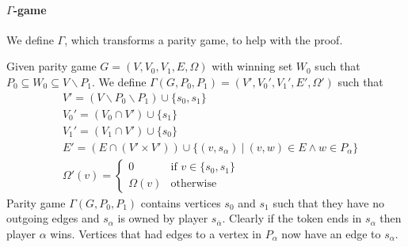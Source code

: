 \documentclass[]{article}
\begin{document}
	\paragraph{$\Gamma$-game} We define $\Gamma$, which transforms a parity game, to help with the proof.
	
	Given parity game $G=(V,V_0,V_1,E,\Omega)$ with winning set $W_0$ such that $P_0 \subseteq W_0 \subseteq V \backslash P_1$. We define $\Gamma(G,P_0,P_1) = (V',V_0',V_1',E',\Omega')$ such that
		\begin{align*}
		&V' = (V \backslash P_0 \backslash P_1) \cup \{s_0,s_1\}\\
		&V_0' = (V_0 \cap V') \cup \{s_1\}\\
		&V_1' = (V_1 \cap V') \cup \{s_0\}\\
		&E' = (E \cap (V' \times V')) \cup \{ (v,s_\alpha)\ |\ (v,w) \in E \wedge w \in P_\alpha \}\\
		&\Omega'(v) = \begin{cases}0 & \text{if } v\in \{s_0,s_1\}\\
		\Omega(v) & \text{otherwise}\end{cases}
		\end{align*}
	Parity game $\Gamma(G,P_0,P_1)$ contains vertices $s_0$ and $s_1$ such that they have no outgoing edges and $s_\alpha$ is owned by player $s_{\overline{\alpha}}$. Clearly if the token ends in $s_\alpha$ then player $\alpha$ wins. Vertices that had edges to a vertex in $P_\alpha$ now have an edge to $s_\alpha$.
	
\end{document}

